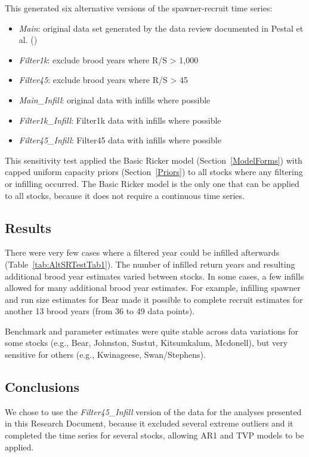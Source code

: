 \documentclass[french,11pt]{book}
\begin{document}
This generated six alternative versions of the spawner-recruit time series:
\begin{itemize}

\item
  \emph{Main}: original data set generated by the data review documented in Pestal et al. ()
\item
  \emph{Filter1k}: exclude brood years where R/S \textgreater{} 1,000
\item
  \emph{Filter45}: exclude brood years where R/S \textgreater{} 45
\item
  \emph{Main\_Infill}: original data with infills where possible
\item
  \emph{Filter1k\_Infill}: Filter1k data with infills where possible
\item
  \emph{Filter45\_Infill}: Filter45 data with infills where possible
\end{itemize}
This sensitivity test applied the Basic Ricker model (Section~\ref{ModelForms}) with capped uniform capacity priors (Section~\ref{Priors}) to all stocks where any filtering or infilling occurred. The Basic Ricker model is the only one that can be applied to all stocks, because it does not require a continuous time series.

\subsection{Results}\label{results-2}

There were very few cases where a filtered year could be infilled afterwards (Table~\ref{tab:AltSRTestTab1}). The number of infilled return years and resulting additional brood year estimates varied between stocks. In some cases, a few infills allowed for many additional brood year estimates. For example, infilling spawner and run size estimates for Bear made it possible to complete recruit estimates for another 13 brood years (from 36 to 49 data points).

Benchmark and parameter estimates were quite stable across data variations for some stocks (e.g., Bear, Johnston, Sustut, Kitsumkalum, Mcdonell), but very sensitive for others (e.g., Kwinageese, Swan/Stephens).

\subsection{Conclusions}\label{conclusions}

We chose to use the \emph{Filter45\_Infill} version of the data for the analyses presented in this Research Document, because it excluded several extreme outliers and it completed the time series for several stocks, allowing AR1 and TVP models to be applied.
\end{document}
